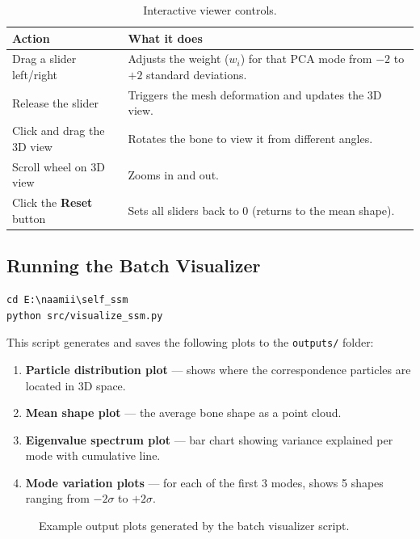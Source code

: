 \documentclass[12pt,a4paper]{article}
\begin{document}
\begin{table}[H]
\centering
\renewcommand{\arraystretch}{1.4}
\begin{tabular}{@{}lp{9cm}@{}}
\toprule
\textbf{Action} & \textbf{What it does} \\
\midrule
Drag a slider left/right & Adjusts the weight ($w_i$) for that PCA mode from $-2$ to $+2$ standard deviations. \\
Release the slider & Triggers the mesh deformation and updates the 3D view. \\
Click and drag the 3D view & Rotates the bone to view it from different angles. \\
Scroll wheel on 3D view & Zooms in and out. \\
Click the \textbf{Reset} button & Sets all sliders back to 0 (returns to the mean shape). \\
\bottomrule
\end{tabular}
\caption{Interactive viewer controls.}
\label{tab:controls}
\end{table}

\subsection{Running the Batch Visualizer}

\begin{lstlisting}[title={\textbf{Generate static plots}}]
cd E:\naamii\self_ssm
python src/visualize_ssm.py
\end{lstlisting}

This script generates and saves the following plots to the \texttt{outputs/} folder:

\begin{enumerate}
    \item \textbf{Particle distribution plot} --- shows where the correspondence particles are located in 3D space.
    \item \textbf{Mean shape plot} --- the average bone shape as a point cloud.
    \item \textbf{Eigenvalue spectrum plot} --- bar chart showing variance explained per mode with cumulative line.
    \item \textbf{Mode variation plots} --- for each of the first 3 modes, shows 5 shapes ranging from $-2\sigma$ to $+2\sigma$.
\end{enumerate}

\begin{figure}[H]
    \centering
    \caption{Example output plots generated by the batch visualizer script.}
    \label{fig:batch_outputs}
\end{figure}
\end{document}
